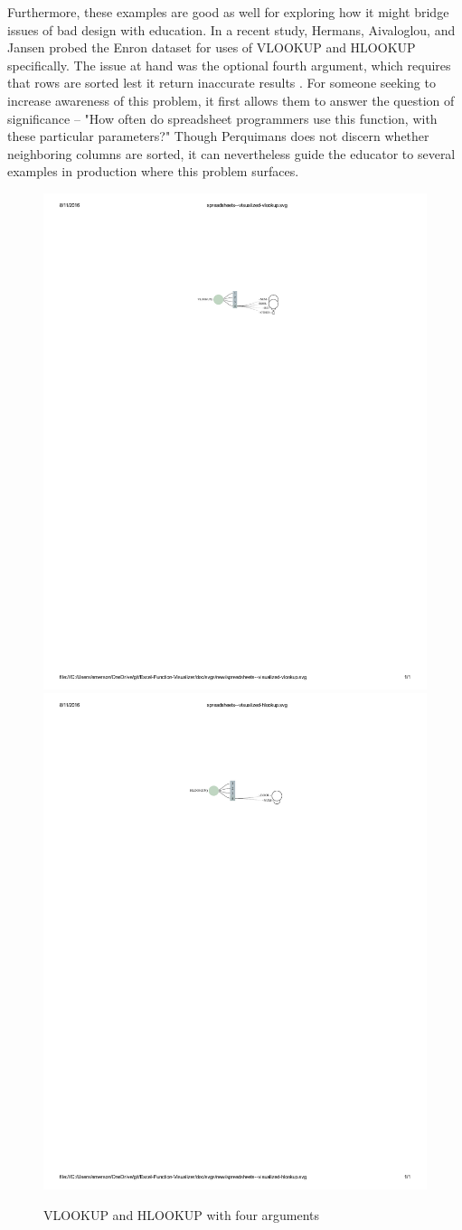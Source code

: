 \documentclass[conference]{IEEEtran}
\newcommand{\toolname}{Perquimans } \newcommand{\toolnameend}{Perquimans}
\begin{document}
	Furthermore, these examples are good as well for exploring how it might bridge
	issues of bad design with education. In a recent study, Hermans, Aivaloglou,
	and Jansen probed the Enron dataset for uses of VLOOKUP and HLOOKUP
	specifically. The issue at hand was the optional fourth argument, which
	requires that rows are sorted lest it return inaccurate results
	\cite{hermans2015detecting}. For someone seeking to increase awareness of this
	problem, it first allows them to answer the question of significance -- "How
	often do spreadsheet programmers use this function, with these particular
	parameters?" Though \toolname does not discern whether neighboring columns are
	sorted, it can nevertheless guide the educator to several examples in
	production where this problem surfaces. \par
	
	\begin{figure}[h] \centering \includegraphics[width=.5\textwidth]{vlookup}
		\includegraphics[width=.5\textwidth]{hlookup} \caption{VLOOKUP and HLOOKUP with
			four arguments} \label{fig:vhlookups}\end{figure}
	
\end{document}
